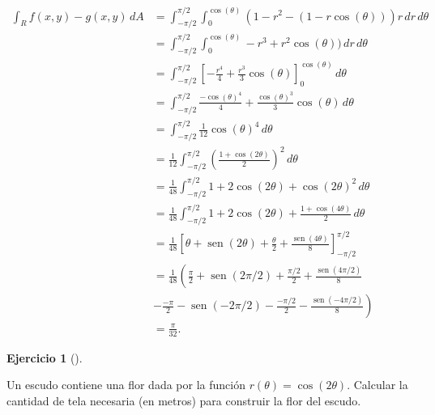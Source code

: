 \documentclass[
  a4paper,
]{scrreport}
\theoremstyle{definition}
\newtheorem{exercise}{Ejercicio}[chapter]
\theoremstyle{remark}
\begin{document}
\begin{tcolorbox}
\begin{align*}
\int_{R} f(x,y)-g(x,y)\,dA
&= \int_{-\pi/2}^{\pi/2} \int_0^{\cos(\theta)} (1-r^2 - (1-r\cos(\theta)))r\,dr\,d\theta \\
&= \int_{-\pi/2}^{\pi/2} \int_0^{\cos(\theta)} -r^3+r^2\cos(\theta))\,dr\,d\theta \\
&= \int_{-\pi/2}^{\pi/2} \left[-\frac{r^4}{4}+\frac{r^3}{3}\cos(\theta)\right]_0^{\cos(\theta)} \,d\theta \\
&= \int_{-\pi/2}^{\pi/2} \frac{-\cos(\theta)^4}{4}+\frac{\cos(\theta)^3}{3}\cos(\theta) \,d\theta \\
&= \int_{-\pi/2}^{\pi/2} \frac{1}{12}\cos(\theta)^4 \,d\theta \\
&= \frac{1}{12}\int_{-\pi/2}^{\pi/2} \left(\frac{1+\cos(2\theta)}{2}\right)^2 \,d\theta \\
&= \frac{1}{48}\int_{-\pi/2}^{\pi/2} 1+2\cos(2\theta)+\cos(2\theta)^2\,d\theta \\
&= \frac{1}{48}\int_{-\pi/2}^{\pi/2} 1+2\cos(2\theta)+\frac{1+\cos(4\theta)}{2}\,d\theta \\
&= \frac{1}{48}\left[\theta+\operatorname{sen}(2\theta)+\frac{\theta}{2}+\frac{\operatorname{sen}(4\theta)}{8}\right]_{-\pi/2}^{\pi/2} \\
&= \frac{1}{48}\left(\frac{\pi}{2}+\operatorname{sen}(2\pi/2)+\frac{\pi/2}{2}+\frac{\operatorname{sen}(4\pi/2)}{8}\right. \\
&\left.- \frac{-\pi}{2} - \operatorname{sen}(-2\pi/2)-\frac{-\pi/2}{2}-\frac{\operatorname{sen}(-4\pi/2)}{8}\right) \\
&= \frac{\pi}{32}.
\end{align*}

\end{tcolorbox}

\begin{exercise}[]\protect\hypertarget{exr-integral-polar-petalo}{}\label{exr-integral-polar-petalo}

Un escudo contiene una flor dada por la función
\(r(\theta) = \cos(2\theta)\). Calcular la cantidad de tela necesaria
(en metros) para construir la flor del escudo.

\end{exercise}
\end{document}
